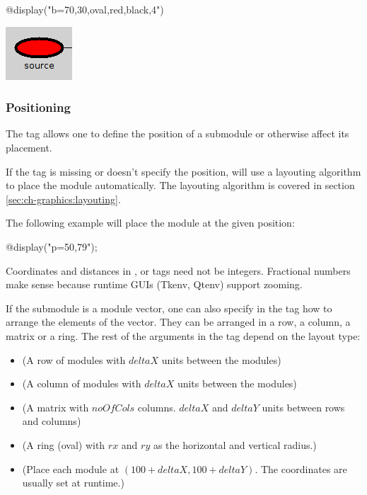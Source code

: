 \begin{ned}
@display("b=70,30,oval,red,black,4")
\end{ned}

\begin{center}
\includegraphics{figures/graphics-btag}
\end{center}

\subsubsection{Positioning}

The  tag allows one to define the position of a submodule or
otherwise affect its placement.

\begin{note}
If the  tag is missing or doesn't specify the position, {\opp} will
use a layouting algorithm to place the module automatically. The layouting
algorithm is covered in section \ref{sec:ch-graphics:layouting}.
\end{note}

The following example will place the module at the given position:

\begin{ned}
@display("p=50,79");
\end{ned}

\begin{note}
Coordinates and distances in ,  or  tags need not
be integers. Fractional numbers make sense because runtime GUIs (Tkenv,
Qtenv) support zooming.
\end{note}

If the submodule is a module vector, one can also specify in the 
tag how to arrange the elements of the vector. They can be arranged in a
row, a column, a matrix or a ring. The rest of the arguments in the 
tag depend on the layout type:

\begin{itemize}
  \item {} (A row of modules with $deltaX$ units between the modules)
  \item {} (A column of modules with $deltaX$ units between the modules)
  \item {} (A matrix with $noOfCols$ columns.
            $deltaX$ and $deltaY$ units between rows and columns)
  \item {} (A ring (oval) with $rx$ and $ry$ as the horizontal and vertical radius.)
  \item {} (Place each module at $(100+deltaX, 100+deltaY)$.
            The coordinates are usually set at runtime.)
\end{itemize}

